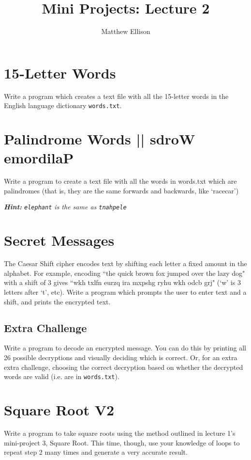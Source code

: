 \documentclass{hitec}
\title{Mini Projects: Lecture 2}
\author{Matthew Ellison}
\begin{document}
\maketitle


\section{15-Letter Words} 
Write a program which creates a text file with all the 15-letter words in the English language dictionary \texttt{words.txt}.

\section{Palindrome Words || sdroW emordilaP}
Write a program to create a text file with all the words in words.txt which are palindromes (that is, they are the same forwards and backwards, like `racecar')

\noindent \emph{\textbf{Hint:}  \texttt{\textquotesingle elephant\textquotesingle[::-1]} is the same as \texttt{\textquotesingle tnahpele\textquotesingle}}

\section{Secret Messages}
The Caesar Shift cipher encodes text by shifting each letter a fixed amount in the alphabet. For example, encoding ``the quick brown fox jumped over the lazy dog" with a shift of 3 gives ``wkh txlfn eurzq ira mxpshg ryhu wkh odcb grj" (`w' is 3 letters after `t', etc). Write a program which prompts the user to enter text and a shift, and prints the encrypted text.

\subsection{Extra Challenge}
 Write a program to decode an encrypted message. You can do this by printing all 26 possible decryptions and visually deciding which is correct. Or, for an extra extra challenge, choosing the correct decryption based on whether the decrypted words are valid (i.e. are in \texttt{words.txt}).

\section{Square Root V2}
Write a program to take square roots using the method outlined in lecture 1's mini-project 3, Square Root. This time, though, use your knowledge of loops to repeat step
2 many times and generate a very accurate result.
\end{document}
